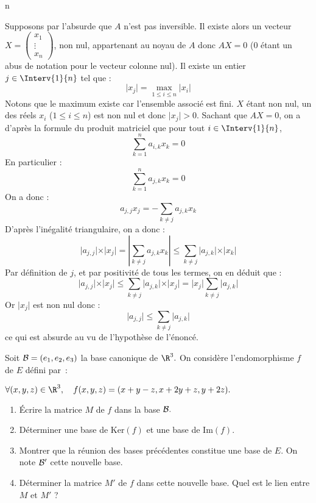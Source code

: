 n\documentclass[a4paper,10pt]{report}
\begin{document}
\corr Supposons par l'absurde que $A$ n'est pas inversible. Il existe alors un vecteur $X = \begin{pmatrix}
x_1 \\
\vdots \\
x_n
\end{pmatrix}$, non nul, appartenant au noyau de $A$ donc $AX= 0$ ($0$ étant un abus de notation pour le vecteur colonne nul). Il existe un entier $j \in \Interv{1}{n}$ tel que :
$$ \vert x_j \vert = \max_{1 \leq i \leq n} \vert x_i \vert$$
Notons que le maximum existe car l'ensemble associé est fini. $X$ étant non nul, un des réels $x_i$ ($1 \leq i \leq n$) est non nul et donc $\vert x_j \vert >0$. Sachant que $AX=0$, on a d'après la formule du produit matriciel que pour tout $i \in \Interv{1}{n}$,
$$ \sum_{k=1}^n a_{i,k} x_k = 0$$
En particulier :
$$ \sum_{k=1}^n a_{j,k} x_k = 0$$
On a donc :
$$ a_{j,j} x_j = - \sum_{k \neq j} a_{j,k} x_k$$
D'après l'inégalité triangulaire, on a donc :
$$ \vert a_{j,j} \vert \times \vert x_j \vert = \left\vert  \sum_{k \neq j} a_{j,k} x_k \right\vert \leq \sum_{k \neq j} \vert a_{j,k} \vert \times \vert x_k \vert$$
Par définition de $j$, et par positivité de tous les termes, on en déduit que :
$$  \vert a_{j,j} \vert \times \vert x_j \vert \leq \sum_{k \neq j} \vert a_{j,k} \vert \times \vert x_j \vert =  \vert x_j \vert\sum_{k \neq j} \vert a_{j,k} \vert$$
Or $\vert x_j \vert$ est non nul donc :
$$ \vert a_{j,j} \vert  \leq  \sum_{k \neq j} \vert a_{j,k} \vert$$
ce qui est absurde au vu de l'hypothèse de l'énoncé.

\begin{Exercice}{} Soit ${\cal B}=(e_1,e_2,e_3)$ la base canonique de $\R^3.$ On consid\`ere
l'endomorphisme $f$ de $E$ d\'efini par~:

\begin{center}
$\forall (x,y,z)\in\R^3,\quad f(x,y,z)=(x+y-z,x+2y+z,y+2z).$
\end{center}

\begin{enumerate}

\item Écrire la matrice $M$ de $f$ dans la base ${\cal B}.$

\item D\'eterminer une base de $\textrm{Ker}(f)$ et une base de $\textrm{Im}(f)$.

\item Montrer que la r\'eunion des bases pr\'ec\'edentes constitue une base de $E$. On note ${\cal B}'$ cette nouvelle base.

\item  D\'eterminer la matrice $M'$ de $f$ dans cette nouvelle base. Quel est le lien entre $M$ et $M'$ ?
\end{enumerate}

\end{Exercice}
\end{document}
